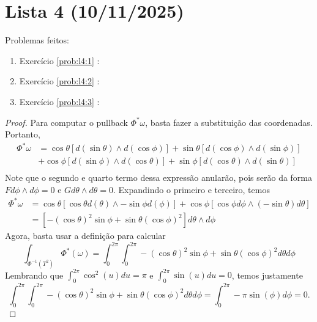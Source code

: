 \clearpage
\section{Lista 4 (10/11/2025)}

Problemas feitos:
\begin{enumerate}
    \item Exercício \ref{prob:l4:1} : \checkmark
    \item Exercício \ref{prob:l4:2} : \checkmark
    \item Exercício \ref{prob:l4:3} : \checkmark
\end{enumerate}


\begin{problem}
    \label{prob:l4:1}
\end{problem}
\begin{proof}
    Para computar o pullback $\Phi^*\omega$, basta fazer a substituição das coordenadas. Portanto,
    \begin{align*}
        \Phi^* \omega &= \cos\theta [d(\sin\theta) \wedge d(\cos\phi)] + \sin\theta[d(\cos\phi) \wedge d(\sin\phi)] \\
                &+ \cos\phi[d(\sin\phi) \wedge d(\cos\theta)] + \sin\phi[d(\cos\theta) \wedge d(\sin\theta)]\\
    \end{align*} 
    Note que o segundo e quarto termo dessa expressão anularão, pois serão da forma $Fd\phi \wedge d\phi = 0$ e $Gd\theta \wedge d\theta = 0$.
    Expandindo o primeiro e terceiro, temos
    \begin{align*}
        \Phi^* \omega &= \cos\theta [\cos\theta d(\theta) \wedge -\sin\phi d(\phi)] + \cos\phi[\cos\phi d\phi \wedge (-\sin\theta) d\theta] \\
                      &= [-(\cos\theta)^2\sin\phi + \sin\theta(\cos\phi)^2] d\theta \wedge d\phi
    \end{align*}
    Agora, basta usar a definição para calcular
    \[
    \int_{\Phi^{-1}(T^2)} \Phi^*(\omega) = \int_0^{2\pi}\int_0^{2\pi} -(\cos\theta)^2\sin\phi + \sin\theta(\cos\phi)^2 d\theta d\phi
    \]
    Lembrando que $\int_0^{2\pi} \cos^2(u) du = \pi$ e $\int_0^{2\pi} \sin(u) du = 0$, temos justamente
    \[
    \int_0^{2\pi}\int_0^{2\pi} -(\cos\theta)^2\sin\phi + \sin\theta(\cos\phi)^2 d\theta d\phi = \int_0^{2\pi} -\pi \sin(\phi) d\phi = 0.
    \]
\end{proof}



